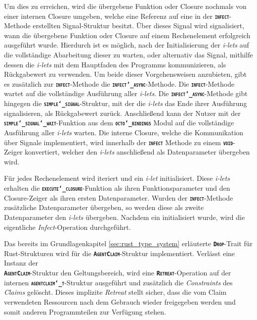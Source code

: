 Um dies zu erreichen, wird die übergebene Funktion oder Closure nochmals von einer internen Closure umgeben,
welche eine Referenz auf eine in der \texttt{\textsc{\textbf{infect}}}-Methode erstellten Signal-Struktur besitzt.
Über dieses Signal wird signalisiert, wann die übergebene Funktion oder Closure auf einem Rechenelement erfolgreich
ausgeführt wurde.
Hierdurch ist es möglich, nach der Initialisierung der \textit{i-lets} auf die
vollständige Abarbeitung dieser zu warten, oder alternativ das Signal, mithilfe dessen die \textit{i-lets} mit dem
Hauptfaden des Programms kommunizieren, als Rückgabewert zu verwenden.
Um beide dieser Vorgehensweisen anzubieten, gibt es zusätzlich zur \texttt{\textsc{\textbf{infect}}}-Methode
die \texttt{\textsc{\textbf{infect\char`_async}}}-Methode. Die \texttt{\textsc{\textbf{infect}}}-Methode wartet auf
die vollständige Ausführung aller \textit{i-lets}. Die \texttt{\textsc{\textbf{infect\char`_async}}}-Methode gibt hingegen
die \texttt{\textsc{\textbf{simple\char`_signal}}}-Struktur, mit der die \textit{i-lets} das Ende ihrer Ausführung signalisieren,
als Rückgabewert zurück.
Anschließend kann der Nutzer mit der
\texttt{\textsc{\textbf{simple\char`_signal\char`_wait}}}-Funktion aus dem
\texttt{\textsc{\textbf{octo\char`_bindings}}}
Modul auf die vollständige Ausführung aller \textit{i-lets} warten.
Die interne Closure, welche die Kommunikation über Signale implementiert, wird innerhalb der
\texttt{\textsc{\textbf{infect}}} Methode zu einem \texttt{\textsc{\textbf{void}}}-Zeiger konvertiert,
welcher den \textit{i-lets} anschließend als Datenparameter übergeben wird.

Für jedes Rechenelement wird iteriert und ein \textit{i-let} initialisiert.
Diese \textit{i-lets} erhalten die \texttt{\textsc{\textbf{execute\char`_closure}}}-Funktion als ihren
Funktionsparameter und den Closure-Zeiger als ihren ersten Datenparameter.
Wurden der \texttt{\textsc{\textbf{infect}}}-Methode zusätzliche Datenparameter
übergeben, so werden diese als zweite Datenparameter den \textit{i-lets} übergeben.
Nachdem ein  initialisiert wurde, wird die eigentliche \textit{Infect}-Operation durchgeführt.

Das bereits im Grundlagenkapitel \ref{sec:rust_type_system} erläuterte \texttt{\textsc{\textbf{Drop}}}-Trait für Rust-Strukturen wird für die
\texttt{\textsc{\textbf{AgentClaim}}}-Struktur implementiert.
Verlässt eine Instanz der \\
\texttt{\textsc{\textbf{AgentClaim}}}-Struktur den Geltungsbereich, wird eine
\texttt{\textsc{\textbf{Retreat}}}-Operation auf der internen
\texttt{\textsc{\textbf{agentclaim\char`_t}}}-Struktur ausgeführt und zusätzlich
die \textit{Constraints} des \textit{Claims} gelöscht. Dieses implizite \textit{Retreat}
stellt sicher, dass die vom Claim verwendeten Ressourcen nach dem Gebrauch wieder freigegeben werden und
somit anderen Programmteilen zur Verfügung stehen.
